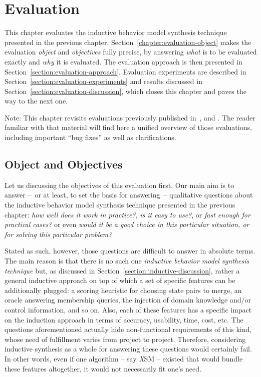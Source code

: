 \chapter{Evaluation\label{chapter:evaluation}}

This chapter evaluates the inductive behavior model synthesis technique presented in the previous chapter. Section~\ref{chapter:evaluation-object} makes the evaluation \emph{object} and \emph{objectives} fully precise, by answering \emph{what} is to be evaluated exactly and \emph{why} it is evaluated. The evaluation approach is then presented in Section~\ref{section:evaluation-approach}. Evaluation experiments are described in Section~\ref{section:evaluation-experiments} and results discussed in Section~\ref{section:evaluation-discussion}, which closes this chapter and paves the way to the next one.

Note: This chapter revisits evaluations previously published in~\cite{Damas:2006}, \cite{Dupont:2008} and \cite{Lambeau:2008}. The reader familiar with that material will find here a unified overview of those evaluations, including important ``bug fixes'' as well as clarifications.

\section{Object and Objectives\label{chapter:evaluation-object}}

Let us discussing the objectives of this evaluation first. Our main aim is to answer --~or at least, to set the basis for answering~-- qualitative questions about the inductive behavior model synthesis technique presented in the previous chapter: \emph{how well does it work in practice?}, \emph{is it easy to use?}, or \emph{fast enough for practical cases?} or even \emph{would it be a good choice in this particular situation, or for solving this particular problem?}

Stated as such, however, those questions are difficult to answer in absolute terms. The main reason is that there is no such one \emph{inductive behavior model synthesis technique} but, as discussed in Section~\ref{section:inductive-discussion}, rather a general inductive approach on top of which a set of specific features can be additionally plugged: a scoring heuristic for choosing state pairs to merge, an oracle answering membership queries, the injection of domain knowledge and/or control information, and so on. Also, each of these features has a specific impact on the induction approach in terms of accuracy, usability, time, cost, etc. The questions aforementioned actually hide non-functional requirements of this kind, whose need of fulfillment varies from project to project. Therefore, considering inductive synthesis as a whole for answering these questions would certainly fail. In other words, even if one algorithm -- say \emph{X}SM -- existed that would bundle these features altogether, it would not necessarily fit one's need.

